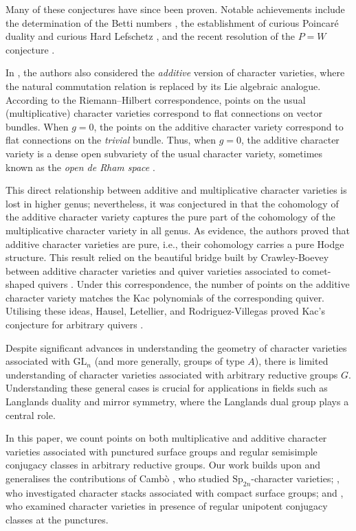 \documentclass[12pt]{amsart}
\theoremstyle{plain}
\theoremstyle{definition}
\theoremstyle{remark}
\newcommand{\GL}{\mathrm{GL}}
\begin{document}
 Many of these conjectures have since been proven. Notable achievements include the determination of the Betti numbers \cite{SchiffmannAnnals2016, MellitInventiones21, Mellit20}, the establishment of curious Poincaré duality and curious Hard Lefschetz \cite{MellitDecomposition}, and the recent resolution of the $P=W$ conjecture \cite{hausel2022p, maulik, HoskinPW}. 

In \cite{HLRV11}, the authors also considered the \emph{additive} version of character varieties, where the natural commutation relation is replaced by its Lie algebraic analogue. According to the Riemann--Hilbert correspondence, points on the usual (multiplicative) character varieties correspond to flat connections on vector bundles. When $g=0$, the points on the additive character variety correspond to flat connections on the \emph{trivial} bundle. Thus, when $g=0$, the additive character variety is a dense open subvariety of the usual character variety, sometimes known as the \emph{open de Rham space} \cite{HWW23}. 

This direct relationship between additive and multiplicative character varieties is lost in higher genus; nevertheless, it was conjectured in \cite{HLRV11} that the cohomology of the additive character variety captures the pure part of the cohomology of the multiplicative character variety in all genus. As evidence, the authors proved that additive character varieties are pure, i.e., their cohomology carries a pure Hodge structure. This result relied on the beautiful bridge built by Crawley-Boevey between additive character varieties and quiver varieties associated to comet-shaped quivers \cite{CBIndecomposable}. Under this correspondence, the number of points on the additive character variety matches the Kac polynomials of the corresponding quiver. Utilising these ideas, Hausel, Letellier, and Rodriguez-Villegas proved Kac's conjecture for arbitrary quivers \cite{HLVKacAnnals2013}.


Despite significant advances in understanding the geometry of character varieties associated with $\GL_n$ (and more generally, groups of type $A$), there is limited understanding of character varieties associated with arbitrary reductive groups $G$. Understanding these general cases is crucial for applications in fields such as Langlands duality and mirror symmetry, where the Langlands dual group plays a central role. 

In this paper, we count points on both multiplicative and additive character varieties associated with punctured surface groups and regular semisimple conjugacy classes in arbitrary reductive groups. Our work builds upon and generalises the contributions of Camb\`{o} \cite{Cambo17}, who studied $\mathrm{Sp}_{2n}$-character varieties; \cite{BK22}, who investigated character stacks associated with compact surface groups; and \cite{KNP25}, who examined character varieties in presence of regular unipotent conjugacy classes at the punctures.
\end{document}
